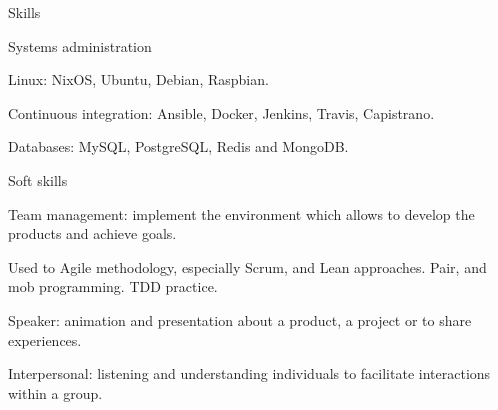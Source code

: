 \begin{rSection}{Skills}
  \begin{rSubsection}{Systems administration}{}{}{}
    \item Linux: NixOS, Ubuntu, Debian, Raspbian.
    \item Continuous integration: Ansible, Docker, Jenkins, Travis, Capistrano.
    \item Databases: MySQL, PostgreSQL, Redis and MongoDB.
  \end{rSubsection}


  \begin{rSubsection}{Soft skills}{}{}{}
    \item Team management: implement the environment which allows to develop the products and achieve goals.
    \item Used to Agile methodology, especially Scrum, and Lean approaches. Pair, and mob programming. TDD practice.
    \item Speaker: animation and presentation about a product, a project or to share experiences.
    \item Interpersonal: listening and understanding individuals to facilitate interactions within a group.
  \end{rSubsection}

\end{rSection}
